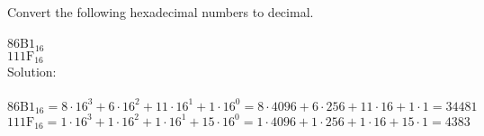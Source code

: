 Convert the following hexadecimal numbers to decimal. \\
\\
$86\textrm{B}1_{16}$ \\
$111\textrm{F}_{16}$ \\

Solution: \\
\\
$86\textrm{B}1_{16} = 8 \cdot 16^3 + 6 \cdot 16^2 + 11 \cdot 16^1 + 1 \cdot 16^0 = 8 \cdot 4096 + 6 \cdot 256 + 11 \cdot 16 + 1 \cdot 1 = 34481$ \\
$111\textrm{F}_{16} = 1 \cdot 16^3 + 1 \cdot 16^2 + 1 \cdot 16^1 + 15 \cdot 16^0 = 1 \cdot 4096 + 1 \cdot 256 + 1 \cdot 16 + 15 \cdot 1 = 4383$ \\
\\
